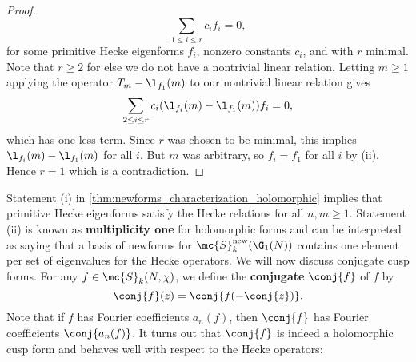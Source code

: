 \begin{proof}
      \[
        \sum_{1 \le i \le r}c_{i}f_{i} = 0,
      \]
      for some primitive Hecke eigenforms $f_{i}$, nonzero constants $c_{i}$, and with $r$ minimal. Note that $r \ge 2$ for else we do not have a nontrivial linear relation. Letting $m \ge 1$ applying the operator $T_{m}-\l_{f_{1}}(m)$ to our nontrivial linear relation gives
      \[
        \sum_{2 \le i \le r}c_{i}(\l_{f_{i}}(m)-\l_{f_{1}}(m))f_{i} = 0,
      \]
      which has one less term. Since $r$ was chosen to be minimal, this implies $\l_{f_{i}}(m)-\l_{f_{1}}(m)$ for all $i$. But $m$ was arbitrary, so $f_{i} = f_{1}$ for all $i$ by (ii). Hence $r = 1$ which is a contradiction.
    \end{proof}

    Statement (i) in \cref{thm:newforms_characterization_holomorphic} implies that primitive Hecke eigenforms satisfy the Hecke relations for all $n,m \ge 1$. Statement (ii) is known as \textbf{multiplicity one} for holomorphic forms and can be interpreted as saying that a basis of newforms for $\mc{S}_{k}^{\mathrm{new}}(\G_{1}(N))$ contains one element per set of eigenvalues for the Hecke operators. We will now discuss conjugate cusp forms. For any $f \in \mc{S}_{k}(N,\chi)$, we define the \textbf{conjugate} $\conj{f}$ of $f$ by
    \[
      \conj{f}(z) = \conj{f(-\conj{z})}.
    \]
    Note that if $f$ has Fourier coefficients $a_{n}(f)$, then $\conj{f}$ has Fourier coefficients $\conj{a_{n}(f)}$. It turns out that $\conj{f}$ is indeed a holomorphic cusp form and behaves well with respect to the Hecke operators:

